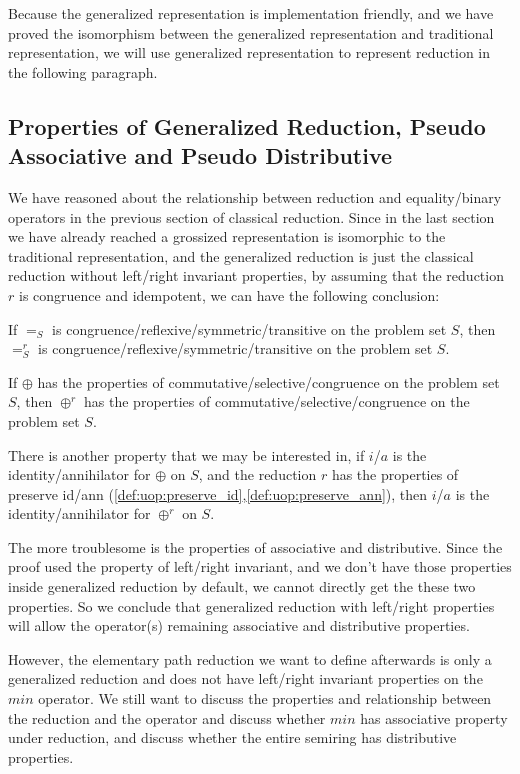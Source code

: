 \documentclass[a4paper,10pt]{article}
\begin{document}
Because the generalized representation is implementation friendly, and we have proved the isomorphism between the generalized representation and traditional representation, we will use generalized representation to represent reduction in the following paragraph.

\subsection{Properties of Generalized Reduction, Pseudo Associative and Pseudo Distributive}
We have reasoned about the relationship between reduction and equality/binary operators in the previous section of classical reduction. 
Since in the last section we have already reached a grossized representation is isomorphic to the traditional representation, and the generalized reduction is just the classical reduction without left/right invariant properties, by assuming that the reduction $r$ is congruence and idempotent, we can have the following conclusion:

If $=_S$ is congruence/reflexive/symmetric/transitive on the problem set $S$, then $=^r_S$ is congruence/reflexive/symmetric/transitive on the problem set $S$.

If $\oplus$ has the properties of commutative/selective/congruence on the problem set $S$, then $\oplus^r$ has the properties of commutative/selective/congruence on the problem set $S$.

There is another property that we may be interested in, if $i$/$a$ is the identity/annihilator for $\oplus$ on $S$, and the reduction $r$ has the properties of preserve id/ann (\ref{def:uop:preserve_id},\ref{def:uop:preserve_ann}), then $i$/$a$ is the identity/annihilator for $\oplus^r$ on $S$.

The more troublesome is the properties of associative and distributive. Since the proof used the property of left/right invariant, and we don't have those properties inside generalized reduction by default, we cannot directly get the these two properties. So we conclude that generalized reduction with left/right properties will allow the operator(s) remaining associative and distributive properties.

However, the elementary path reduction we want to define afterwards is only a generalized reduction and does not have left/right invariant properties on the $min$ operator. We still want to discuss the properties and relationship between the reduction and the operator and discuss whether $min$ has associative property under reduction, and discuss whether the entire semiring has distributive properties.
\end{document}

